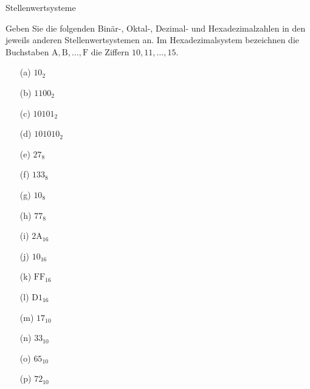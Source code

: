 \begin{exercise}{Stellenwertsysteme}

\begin{body}
Geben Sie die folgenden Binär-, Oktal-, Dezimal- und Hexadezimalzahlen in den jeweils anderen Stellenwertsystemen an. Im Hexadezimalsystem bezeichnen die Buchstaben $\mathrm{A},\mathrm{B}, \dotsc, \mathrm{F}$ die Ziffern $10, 11, \dotsc, 15$.\begin{center}
\begin{minipage}{0.22\textwidth}
\begin{itemize}
\item[(a)] $10_2$
\item[(b)] $1100_2$
\item[(c)] $10101_2$
\item[(d)] $101010_2$
\end{itemize}
\end{minipage}
\begin{minipage}{0.22\textwidth}
\begin{itemize}
\item[(e)] $27_8$
\item[(f)] $133_8$
\item[(g)] $10_8$
\item[(h)] $77_8$
\end{itemize}
\end{minipage}
\begin{minipage}{0.22\textwidth}
\begin{itemize}
\item[(i)] $\mathrm{2A}_{16}$
\item[(j)] $10_{16}$
\item[(k)] $\mathrm{FF}_{16}$
\item[(l)] $\mathrm{D1}_{16}$
\end{itemize}
\end{minipage}
\begin{minipage}{0.22\textwidth}
\begin{itemize}
\item[(m)] $17_{10}$
\item[(n)] $33_{10}$
\item[(o)] $65_{10}$
\item[(p)] $72_{10}$
\end{itemize}
\end{minipage}
\end{center}
\end{body}


\end{exercise}
